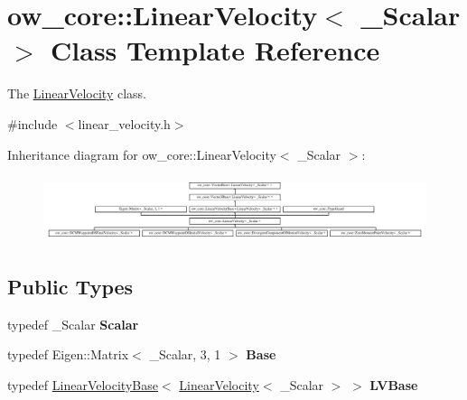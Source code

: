 \hypertarget{classow__core_1_1LinearVelocity}{}\section{ow\+\_\+core\+:\+:Linear\+Velocity$<$ \+\_\+\+Scalar $>$ Class Template Reference}
\label{classow__core_1_1LinearVelocity}


The \hyperlink{classow__core_1_1LinearVelocity}{Linear\+Velocity} class.  




{\ttfamily \#include $<$linear\+\_\+velocity.\+h$>$}

Inheritance diagram for ow\+\_\+core\+:\+:Linear\+Velocity$<$ \+\_\+\+Scalar $>$\+:\begin{figure}[H]
\begin{center}
\leavevmode
\includegraphics[height=1.949861cm]{d3/d6e/classow__core_1_1LinearVelocity}
\end{center}
\end{figure}
\subsection*{Public Types}
\begin{DoxyCompactItemize}
\item 
typedef \+\_\+\+Scalar {\bfseries Scalar}\hypertarget{classow__core_1_1LinearVelocity_a088145bea5e0ce67c36e3704f2d302b1}{}\label{classow__core_1_1LinearVelocity_a088145bea5e0ce67c36e3704f2d302b1}

\item 
typedef Eigen\+::\+Matrix$<$ \+\_\+\+Scalar, 3, 1 $>$ {\bfseries Base}\hypertarget{classow__core_1_1LinearVelocity_a67ac972880f3ac47a54bdc50b65d6e4e}{}\label{classow__core_1_1LinearVelocity_a67ac972880f3ac47a54bdc50b65d6e4e}

\item 
typedef \hyperlink{classow__core_1_1LinearVelocityBase}{Linear\+Velocity\+Base}$<$ \hyperlink{classow__core_1_1LinearVelocity}{Linear\+Velocity}$<$ \+\_\+\+Scalar $>$ $>$ {\bfseries L\+V\+Base}\hypertarget{classow__core_1_1LinearVelocity_af7facc8139519ff8aecc77f3a11aa16a}{}\label{classow__core_1_1LinearVelocity_af7facc8139519ff8aecc77f3a11aa16a}

\end{DoxyCompactItemize}
